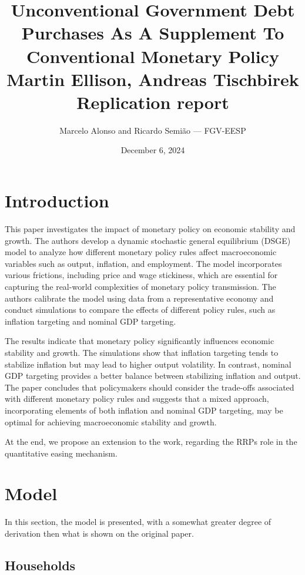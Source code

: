 \documentclass[12pt]{article}
\title{
    \textbf{Unconventional Government Debt Purchases As A Supplement To Conventional Monetary Policy}\\
    {\Large Martin Ellison, Andreas Tischbirek}\\
    Replication report
}
\author{Marcelo Alonso and Ricardo Semião --- FGV-EESP}
\date{December 6, 2024}
\begin{document}
\maketitle



\section{Introduction}

This paper investigates the impact of monetary policy on economic stability and growth. The authors develop a dynamic stochastic general equilibrium (DSGE) model to analyze how different monetary policy rules affect macroeconomic variables such as output, inflation, and employment. The model incorporates various frictions, including price and wage stickiness, which are essential for capturing the real-world complexities of monetary policy transmission. The authors calibrate the model using data from a representative economy and conduct simulations to compare the effects of different policy rules, such as inflation targeting and nominal GDP targeting.

The results indicate that monetary policy significantly influences economic stability and growth. The simulations show that inflation targeting tends to stabilize inflation but may lead to higher output volatility. In contrast, nominal GDP targeting provides a better balance between stabilizing inflation and output. The paper concludes that policymakers should consider the trade-offs associated with different monetary policy rules and suggests that a mixed approach, incorporating elements of both inflation and nominal GDP targeting, may be optimal for achieving macroeconomic stability and growth.

At the end, we propose an extension to the work, regarding the RRPs role in the quantitative easing mechanism.



\section{Model}

In this section, the model is presented, with a somewhat greater degree of derivation then what is shown on the original paper.



\subsection{Households}
\end{document}
